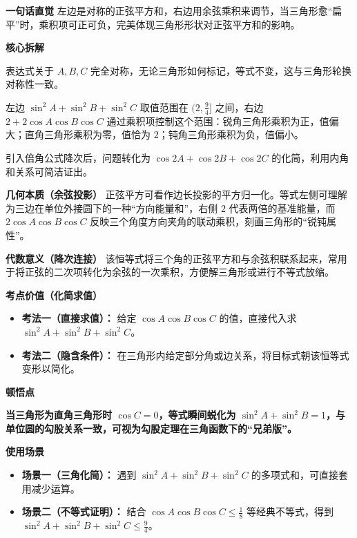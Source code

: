 \begin{explanationbox}
\textbf{\textcolor{CExplanation}{一句话直觉}} 左边是对称的正弦平方和，右边用余弦乘积来调节，当三角形愈“扁平”时，乘积项可正可负，完美体现三角形形状对正弦平方和的影响。

\medskip
\textbf{\textcolor{CExplanation}{核心拆解}}
\begin{description}[style=nextline, leftmargin=2.8em, labelsep=0.5em, itemsep=0.45em]
    \item[\textbf{要点一（对称轮换）：}] 表达式关于 $A,B,C$ 完全对称，无论三角形如何标记，等式不变，这与三角形轮换对称性一致。
    \item[\textbf{要点二（范围调控）：}] 左边 $\sin^2 A+\sin^2 B+\sin^2 C$ 取值范围在 $(2, \frac{9}{4}]$ 之间，右边 $2+2\cos A\cos B\cos C$ 通过乘积项控制这个范围：锐角三角形乘积为正，值偏大；直角三角形乘积为零，值恰为 $2$；钝角三角形乘积为负，值偏小。
    \item[\textbf{要点三（推导入口）：}] 引入倍角公式降次后，问题转化为 $\cos 2A+\cos 2B+\cos 2C$ 的化简，利用内角和关系可简洁证出。
\end{description}

\medskip
\textbf{\textcolor{CExplanation}{几何本质（余弦投影）}}  正弦平方可看作边长投影的平方归一化。等式左侧可理解为三边在单位外接圆下的一种“方向能量和”，右侧 $2$ 代表两倍的基准能量，而 $2\cos A\cos B\cos C$ 反映三个角度方向夹角的联动乘积，刻画三角形的“锐钝属性”。

\medskip
\textbf{\textcolor{CExplanation}{代数意义（降次连接）}}  该恒等式将三个角的正弦平方和与余弦积联系起来，常用于将正弦的二次项转化为余弦的一次乘积，方便解三角形或进行不等式放缩。

\medskip
\textbf{\textcolor{CExplanation}{考点价值（化简求值）}}
\begin{itemize}[leftmargin=*, itemsep=0.5em, topsep=0.4em]
    \item \textbf{考法一（直接求值）：} 给定 $\cos A\cos B\cos C$ 的值，直接代入求 $\sin^2 A+\sin^2 B+\sin^2 C$。
    \item \textbf{考法二（隐含条件）：} 在三角形内给定部分角或边关系，将目标式朝该恒等式变形以简化。
\end{itemize}

\medskip
\textbf{\textcolor{CExplanation}{顿悟点}}

\textbf{当三角形为直角三角形时 $\cos C=0$，等式瞬间蜕化为 $\sin^2 A+\sin^2 B=1$，与单位圆的勾股关系一致，可视为勾股定理在三角函数下的“兄弟版”。}

\medskip
\textbf{\textcolor{CExplanation}{使用场景}}
\begin{itemize}[leftmargin=*, itemsep=0.5em, topsep=0.4em]
    \item \textbf{场景一（三角化简）：} 遇到 $\sin^2 A+\sin^2 B+\sin^2 C$ 的多项式和，可直接套用减少运算。
    \item \textbf{场景二（不等式证明）：} 结合 $\cos A\cos B\cos C\le \frac{1}{8}$ 等经典不等式，得到 $\sin^2 A+\sin^2 B+\sin^2 C\le \frac{9}{4}$。
\end{itemize}
\end{explanationbox}
